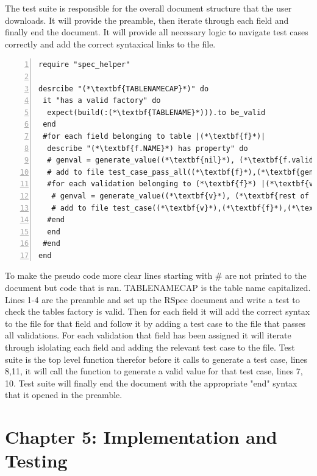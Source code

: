 \documentclass[a4paper,12pt]{article}
\begin{document}
\par The test suite is responsible for the overall document structure that the user downloads. It will provide the preamble, then iterate through each field and finally end the document. It will provide all necessary logic to navigate test cases correctly and add the correct syntaxical links to the file. 
\vspace{3mm}
\begin{lstlisting}[frame=single,numbers=left,caption= {Pseudo code for value generation} label={psuedo:suite}]
require "spec_helper"

desrcibe "(*\textbf{TABLENAMECAP}*)" do
 it "has a valid factory" do
  expect(build(:(*\textbf{TABLENAME}*))).to be_valid
 end
 #for each field belonging to table |(*\textbf{f}*)|
  describe "(*\textbf{f.NAME}*) has property" do
  # genval = generate_value((*\textbf{nil}*), (*\textbf{f.validations}*))
  # add to file test_case_pass_all((*\textbf{f}*),(*\textbf{genval}*))
  #for each validation belonging to (*\textbf{f}*) |(*\textbf{v}*)|
   # genval = generate_value((*\textbf{v}*), (*\textbf{rest of validations}*))
   # add to file test_case((*\textbf{v}*),(*\textbf{f}*),(*\textbf{genval}*))
  #end
  end
 #end
end
\end{lstlisting}
\vspace{3mm}
\par To make the pseudo code more clear lines starting with \# are not printed to the document but code that is ran. TABLENAMECAP is the table name capitalized. Lines 1-4 are the preamble and set up the RSpec document and write a test to check the tables factory is valid. Then for each field it will add the correct syntax to the file for that field and follow it by adding a test case to the file that passes all validations. For each validation that field has been assigned it will iterate through islolating each field and adding the relevant test case to the file. Test suite is the top level function therefor before it calls to generate a test case, lines 8,11, it will call the function to generate a valid value for that test case, lines 7, 10. Test suite will finally end the document with the appropriate "end"  syntax that it opened in the preamble.

\section{Chapter 5: Implementation and Testing}
\end{document}
